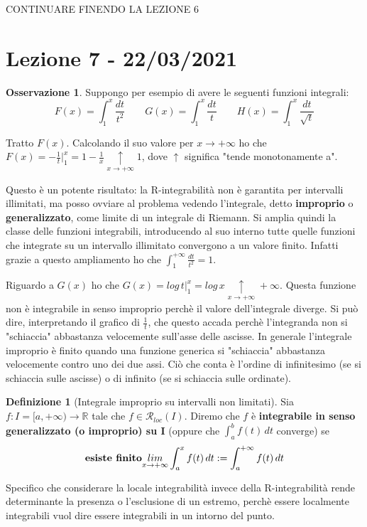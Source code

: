 \documentclass{article}
\theoremstyle{definition}
\theoremstyle{definition}
\theoremstyle{definition}
\newtheorem{definition}{Definizione}[section]
\theoremstyle{definition}
\newtheorem{remark}{Osservazione}[section]
\theoremstyle{definition}
\theoremstyle{definition}
\begin{document}
CONTINUARE FINENDO LA LEZIONE 6

\newpage
\section{Lezione 7 - 22/03/2021}

\begin{remark}
    Suppongo per esempio di avere le seguenti funzioni integrali:
    \[F(x)=\int_1^x\frac{dt}{t^2} \qquad G(x)=\int_1^x\frac{dt}{t} \qquad H(x)=\int_1^x\frac{dt}{\sqrt{t}}\]

    Tratto $F(x)$. Calcolando il suo valore per $x\rightarrow+\infty$ ho che $\displaystyle{F(x)=-\frac{1}{t}\bigg|_1^x=1-\frac{1}{x}}\underset{x\rightarrow+\infty}{\uparrow}1$, dove $\uparrow$ significa "tende monotonamente a".

    Questo è un potente risultato: la R-integrabilità non è garantita per intervalli illimitati, ma posso ovviare al problema vedendo l'integrale, detto \textbf{improprio} o \textbf{generalizzato}, come limite di un integrale di Riemann. Si amplia quindi la classe delle funzioni integrabili, introducendo al suo interno tutte quelle funzioni che integrate su un intervallo illimitato convergono a un valore finito. Infatti grazie a questo ampliamento ho che $\displaystyle{\int_1^{+\infty}\frac{dt}{t^2}=1}$.

    Riguardo a $G(x)$ ho che $G(x)=log\,t\bigg|_1^x=log\,x\underset{x\rightarrow+\infty}{\uparrow}+\infty$. Questa funzione non è integrabile in senso improprio perchè il valore dell'integrale diverge. Si può dire, interpretando il grafico di $\displaystyle{\frac{1}{t}}$, che questo accada perchè l'integranda non si "schiaccia" abbastanza velocemente sull'asse delle ascisse. In generale l'integrale improprio è finito quando una funzione generica si "schiaccia" abbastanza velocemente contro uno dei due assi. Ciò che conta è l'ordine di infinitesimo (se si schiaccia sulle ascisse) o di infinito (se si schiaccia sulle ordinate).
\end{remark}

\begin{definition}[Integrale improprio su intervalli non limitati]
    Sia $f:I=[a,+\infty)\rightarrow\mathbb{R}$ tale che $f\in\mathcal{R}_{loc}(I)$. Diremo che $f$ è \textbf{integrabile in senso generalizzato (o improprio) su I} (oppure che $\int_a^bf(t)\,dt$ converge) se
    \[\text{\textbf{esiste finito}} \underset{x\rightarrow+\infty}{lim}\int_a^xf(t)\,dt:=\int_a^{+\infty}f(t)\,dt\]    

    Specifico che considerare la locale integrabilità invece della R-integrabilità rende determinante la presenza o l'esclusione di un estremo, perchè essere localmente integrabili vuol dire essere integrabili in un intorno del punto.
\end{definition}
\end{document}
